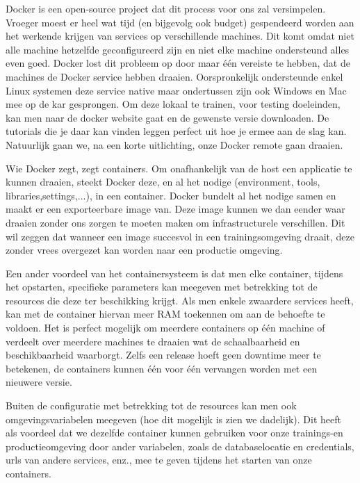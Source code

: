 \documentclass{article}
\begin{document}
	Docker is een open-source project dat dit process voor ons zal versimpelen. Vroeger moest er heel wat tijd (en bijgevolg ook budget) gespendeerd worden aan het werkende krijgen van services op verschillende machines. Dit komt omdat niet alle machine hetzelfde geconfigureerd zijn en niet elke machine ondersteund alles even goed. Docker lost dit probleem op door maar \'e\'en vereiste te hebben, dat de machines de Docker service hebben draaien. Oorspronkelijk ondersteunde enkel Linux systemen deze service native maar ondertussen zijn ook Windows en Mac mee op de kar gesprongen. Om deze lokaal te trainen, voor testing doeleinden, kan men naar de docker website gaat en de gewenste versie downloaden. De tutorials die je daar kan vinden leggen perfect uit hoe je ermee aan de slag kan. Natuurlijk gaan we, na een korte uitlichting, onze Docker remote gaan draaien.
	\par
	Wie Docker zegt, zegt containers. Om onafhankelijk van de host een applicatie te kunnen draaien, steekt Docker deze, en al het nodige (environment, tools, libraries,settings,...), in een container. Docker bundelt al het nodige samen en maakt er een exporteerbare image van. Deze image kunnen we dan eender waar draaien zonder ons zorgen te moeten maken om infrastructurele verschillen. Dit wil zeggen dat wanneer een image succesvol in een trainingsomgeving draait, deze zonder vrees overgezet kan worden naar een productie omgeving.
	\par
	Een ander voordeel van het containersysteem is dat men elke container, tijdens het opstarten, specifieke parameters kan meegeven met betrekking tot de resources die deze ter beschikking krijgt. Als men enkele zwaardere services heeft, kan met de container hiervan meer RAM toekennen om aan de behoefte te voldoen. Het is perfect mogelijk om meerdere containers op één machine of verdeelt over meerdere machines te draaien wat de schaalbaarheid en beschikbaarheid waarborgt. Zelfs een release hoeft geen downtime meer te betekenen, de containers kunnen één voor één vervangen worden met een nieuwere versie.
	\par
	Buiten de configuratie met betrekking tot de resources kan men ook omgevingsvariabelen meegeven (hoe dit mogelijk is zien we dadelijk). Dit heeft als voordeel dat we dezelfde container kunnen gebruiken voor onze trainings-en productieomgeving door ander variabelen, zoals de databaselocatie en credentials, urls van andere services, enz., mee te geven tijdens het starten van onze containers.
\end{document}
